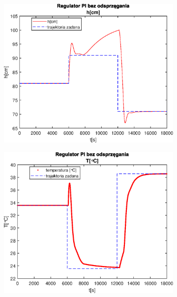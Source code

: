 \begin{figure}[h!]
   \centering
   \begin{subfigure}[b]{0.4\textwidth}
      \includegraphics[width=1\linewidth]{img/PI/noDecoupler/noDisturbance/PINoDecouplerH1Lintrue.eps}
      \caption{}
      \label{fig:fig:PINodDecoupler1Lintrue1}
   \end{subfigure}
       
   \begin{subfigure}[b]{0.4\textwidth}
      \includegraphics[width=1\linewidth]{img/PI/noDecoupler/noDisturbance/PINoDecouplerT1Lintrue.eps}
      \caption{}
      \label{fig:fig:PINodDecoupler1Lintrue2}
   \end{subfigure}
       

\end{figure}
